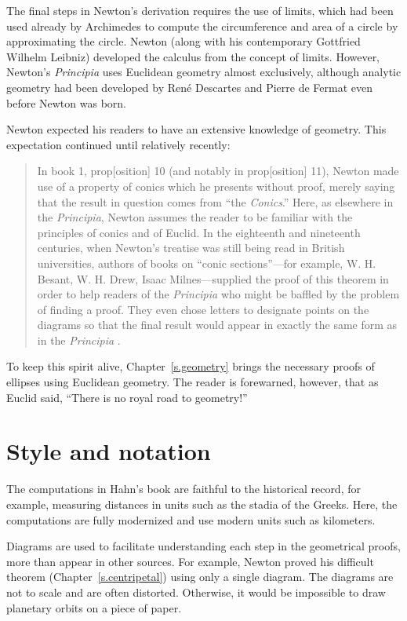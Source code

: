 The final steps in Newton's derivation requires the use of limits, which had been used already by Archimedes to compute the circumference and area of a circle by approximating the circle. Newton (along with his contemporary Gottfried Wilhelm Leibniz) developed the calculus from the concept of limits. However, Newton's \textit{Principia} uses Euclidean geometry almost exclusively, although analytic geometry had been developed by René Descartes and Pierre de Fermat even before Newton was born.

Newton expected his readers to have an extensive knowledge of geometry. This expectation continued until relatively recently:
\begin{quote}
In book 1, prop[osition] 10 (and notably in prop[osition] 11), Newton made use of a property of conics which he presents without proof, merely saying that the result in question comes from ``the \textit{Conics}.'' Here, as elsewhere in the \textit{Principia}, Newton assumes the reader to be familiar with the principles of conics and of Euclid. In the eighteenth and nineteenth centuries, when Newton's treatise was still being read in British universities, authors of books on ``conic sections''---for example, W. H. Besant, W. H. Drew, Isaac Milnes---supplied the proof of this theorem in order to help readers of the \textit{Principia} who might be baffled by the problem of finding a proof. They even chose letters to designate points on the diagrams so that the final result would appear in exactly the same form as in the \textit{Principia} \cite[p.~330]{newton-cohen}.
\end{quote}

To keep this spirit alive, Chapter~\ref{s.geometry} brings the necessary proofs of ellipses using Euclidean geometry. The reader is forewarned, however, that as Euclid said, ``There is no royal road to geometry!''

\section*{Style and notation}

The computations in Hahn's book are faithful to the historical record, for example, measuring distances in units such as the stadia of the Greeks. Here,  the computations are fully modernized and use modern units such as kilometers. 

Diagrams are used to facilitate understanding each step in the geometrical proofs, more than appear in other sources. For example, Newton proved his difficult theorem (Chapter~\ref{s.centripetal}) using only a single diagram. The diagrams are not to scale and are often distorted. Otherwise, it would be impossible to draw planetary orbits on a piece of paper.

